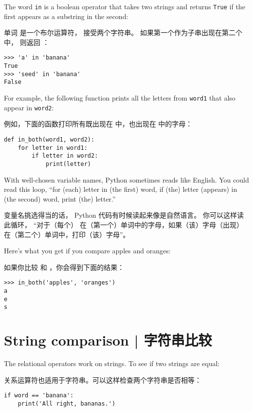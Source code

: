 The word {\tt in} is a boolean operator that takes two strings and
returns {\tt True} if the first appears as a substring in the second:

单词  是一个布尔运算符， 接受两个字符串。 如果第一个作为子串出现在第二个中， 则返回 ：

\begin{lstlisting}
>>> 'a' in 'banana'
True
>>> 'seed' in 'banana'
False
\end{lstlisting}

%
For example, the following function prints all the
letters from {\tt word1} that also appear in {\tt word2}:

例如，下面的函数打印所有既出现在  中，也出现在  中的字母：

\begin{lstlisting}
def in_both(word1, word2):
    for letter in word1:
        if letter in word2:
            print(letter)
\end{lstlisting}

%
With well-chosen variable names,
Python sometimes reads like English.  You could read
this loop, ``for (each) letter in (the first) word, if (the) letter
(appears) in (the second) word, print (the) letter.''

变量名挑选得当的话， Python 代码有时候读起来像是自然语言。 你可以这样读此循环， ``对于（每个） 在（第一个）单词中的字母，如果（该）字母（出现）在（第二个）单词中，打印（该）字母''。

Here's what you get if you compare apples and oranges:

如果你比较  和 ，你会得到下面的结果：

\begin{lstlisting}
>>> in_both('apples', 'oranges')
a
e
s
\end{lstlisting}

%

\section{String comparison  |  字符串比较}
  

The relational operators work on strings.  To see if two strings are equal:

关系运算符也适用于字符串。可以这样检查两个字符串是否相等：

\begin{lstlisting}
if word == 'banana':
    print('All right, bananas.')
\end{lstlisting}

